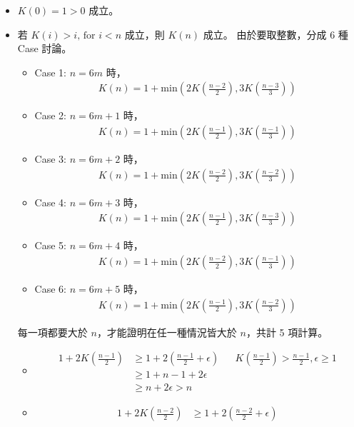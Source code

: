 \documentclass[11pt]{article}
\begin{document}
\begin{itemize}
	\item $K(0) = 1 > 0$ 成立。
	\item 若 $K(i) > i \text{, for } i < n$ 成立，則 $K(n)$ 成立。
		由於要取整數，分成 6 種 Case 討論。
		\begin{itemize}
			\item Case 1: $n = 6m$ 時，
				\begin{align*}
					K(n) = 1 + \text{min}(2K(\frac{n-2}{2}), 3K(\frac{n-3}{3}))
				\end{align*}
			\item Case 2: $n = 6m+1$ 時，
				\begin{align*}
					K(n) = 1 + \text{min}(2K(\frac{n-1}{2}), 3K(\frac{n-1}{3}))
				\end{align*}
			\item Case 3: $n = 6m+2$ 時，
				\begin{align*}
					K(n) = 1 + \text{min}(2K(\frac{n-2}{2}), 3K(\frac{n-2}{3}))
				\end{align*}
			\item Case 4: $n = 6m+3$ 時，
				\begin{align*}
					K(n) = 1 + \text{min}(2K(\frac{n-1}{2}), 3K(\frac{n-3}{3}))
				\end{align*}
			\item Case 5: $n = 6m+4$ 時，
				\begin{align*}
					K(n) = 1 + \text{min}(2K(\frac{n-2}{2}), 3K(\frac{n-1}{3}))
				\end{align*}
			\item Case 6: $n = 6m+5$ 時，
				\begin{align*}
					K(n) = 1 + \text{min}(2K(\frac{n-1}{2}), 3K(\frac{n-2}{3}))
				\end{align*}
		\end{itemize}
	每一項都要大於 $n$，才能證明在任一種情況皆大於 $n$，共計 5 項計算。
	\begin{itemize}
		\item
			\begin{align*}
				1 + 2K(\frac{n-1}{2}) & \ge 1 + 2 \left ( \frac{n-1}{2} + \epsilon \right )
					&& K(\frac{n-1}{2}) > \frac{n-1}{2}, \epsilon \ge 1\\
					& \ge 1 + n - 1 + 2 \epsilon \\
					& \ge n + 2 \epsilon > n
			\end{align*}
		\item 
			\begin{align*}
				1 + 2K(\frac{n-2}{2}) & \ge 1 + 2 \left ( \frac{n-2}{2} + \epsilon \right )

\end{align*}
\end{itemize}
\end{itemize}
\end{document}
